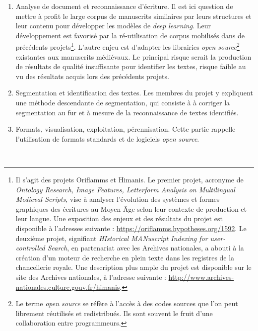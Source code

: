 \documentclass[a4paper,12pt,twoside]{book}
\begin{document}
\begin{enumerate}
	    \item \og Analyse de document et reconnaissance d'écriture\fg{}. Il est ici question de mettre à profit le large corpus de manuscrits similaires par leurs structures et leur contenu pour développer les modèles de \textit{deep learning}. Leur développement est favorisé par la ré-utilisation de corpus mobilisés dans de précédents projets\footnote{Il s'agit des projets Oriflamms et Himanis. Le premier projet, acronyme de \textit{Ontology Research, Image Features, Letterform Analysis on Multilingual Medieval Scripts}, vise à analyser l'évolution des systèmes et formes graphiques des écritures au Moyen Âge selon leur contexte de production et leur langue. Une exposition des enjeux et des résultats du projet est disponible à l'adresses suivante : \url{https://oriflamms.hypotheses.org/1592}. Le deuxième projet, signifiant \textit{HIstorical MANuscript Indexing for user-controlled Search}, en partenariat avec les Archives nationales, a abouti à la création d'un moteur de recherche en plein texte dans les registres de la chancellerie royale. Une description plus ample du projet est disponible sur le site des Archives nationales, à l'adresse suivante : \url{http://www.archives-nationales.culture.gouv.fr/himanis}.}. L'autre enjeu est d'adapter les librairies \textit{open source}\footnote{Le terme \textit{open source} se réfère à l'accès à des codes sources que l'on peut librement réutilisés et redistribués. Ils sont souvent le fruit d'une collaboration entre programmeurs.} existantes aux manuscrits médiévaux. Le principal risque serait la production de résultats de qualité insuffisante pour identifier les textes, risque faible au vu des résultats acquis lors des précédents projets. 
	   \item \og Segmentation et identification des textes\fg{}. Les membres du projet y expliquent une méthode descendante de segmentation, qui consiste à à corriger la segmentation au fur et à  mesure de la reconnaissance de textes identifiés. 
	   \item \og Formats, visualisation, exploitation, pérennisation\fg{}. Cette partie rappelle l'utilisation de formats standards et de logiciels \textit{open source}. 
	\end{enumerate}\\
	
\end{document}
